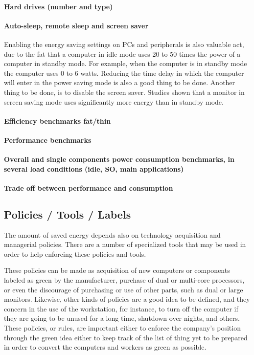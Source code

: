             \paragraph*{Hard drives (number and type)}%
            \paragraph*{Auto-sleep, remote sleep and screen saver} Enabling the energy saving settings on PCs and peripherals is also valuable act, due to the fat that a computer in idle mode uses 20 to 50 times the power of a computer in standby mode. For example, when the computer is in standby mode the computer uses 0 to 6 watts. Reducing the time delay in which the computer will enter in the power saving mode is also a good thing to be done. Another thing to be done, is to disable the screen saver. Studies shown that a monitor in screen saving mode uses significantly more energy than in standby mode.
            \paragraph*{Efficiency benchmarks fat/thin}%
            \paragraph*{Performance benchmarks}%
            \paragraph*{Overall and single components power consumption benchmarks, in several load conditions (idle, SO, main applications)}%
            \paragraph*{Trade off between performance and consumption}%

    \subsection{Policies / Tools / Labels} \label{sec2:policies_tools_labels}
        The amount of saved energy depends also on technology acquisition and managerial policies. There are a number of specialized tools that may be used in order to help enforcing these policies and tools. 

        These policies can be made as acquisition of new computers or components labeled as green by the manufacturer, purchase of dual or multi-core processors, or even the discourage of purchasing or use of other parts, such as dual or large monitors. Likewise, other kinds of policies are a good idea to be defined, and they concern in the use of the workstation, for instance, to turn off the computer if they are going to be unused for a long time, shutdown over nights, and others. These policies, or rules, are important either to enforce the company's position through the green idea either to keep track of the list of thing yet to be prepared in order to convert the computers and workers as green as possible.
        
